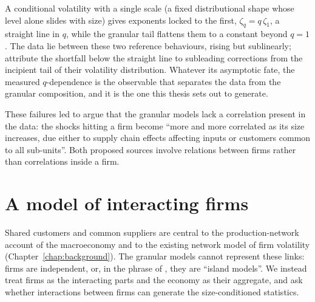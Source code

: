 A conditional
volatility with a single scale (a fixed distributional shape whose level alone slides with
size) gives exponents locked to the first, $\zeta_q = q\,\zeta_1$, a straight line in $q$,
while the granular tail flattens them to a constant beyond $q = 1$. The data lie
between these two reference behaviours, rising but sublinearly; \citet{moran2024} attribute the shortfall below the
straight line to subleading corrections from the incipient tail of their volatility
distribution. Whatever its asymptotic fate, the measured $q$-dependence is the observable that
separates the data from the granular composition, and it is the one this thesis sets out to
generate.

These failures led \citet{moran2024} to argue that the granular models lack a correlation
present in the data: the shocks hitting a firm become ``more and more correlated as its size
increases, due either to supply chain effects affecting inputs or customers common to all
sub-units''. Both proposed sources involve relations between firms rather than correlations
inside a firm.

\section{A model of interacting firms}
\label{sec:intro-move}

Shared customers and common suppliers are central to the production-network account of the
macroeconomy and to the existing network model of firm volatility (Chapter~\ref{chap:background}).
The granular models cannot represent these links: firms are independent, or, in the phrase of
\citet{moran2024}, they are ``island models''. We instead treat firms as the interacting parts
and the economy as their aggregate, and ask whether interactions between firms can generate the
size-conditioned statistics.

